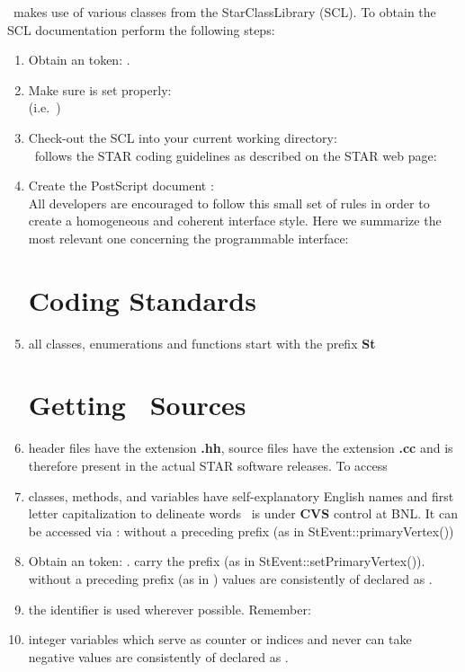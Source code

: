 \StEvent\ makes use of various classes from the StarClassLibrary (SCL).
To obtain the SCL documentation perform the following steps:
\begin{enumerate}
  \item Obtain an  token: .
  \item Make sure  is set properly:\\
    (i.e.~)
  \item Check-out the SCL into your current working directory:\\
\StEvent\ follows the STAR coding guidelines as described on the STAR web page: \\ 
  \item Create the PostScript document :\\
All developers are encouraged to follow this small set of rules 
in order to create a homogeneous and coherent interface style.
Here we summarize the most relevant one concerning the programmable interface:
\section{Coding Standards}  
\item all classes, enumerations and functions start with the prefix \textbf{St}
\section{Getting \StEvent\ Sources}  
\item header files have the extension \textbf{.hh},
    source files have the extension\textbf{ .cc}
and is therefore present in the actual STAR software releases. To access
\item classes, methods, and variables have self-explanatory English names
    and first letter capitalization to delineate words
\StEvent\ is under {\bf CVS} control at BNL.  It can
be accessed via :   
    without a preceding  prefix (as in StEvent::primaryVertex())
  \item Obtain an  token: .
    carry the prefix  (as in  StEvent::setPrimaryVertex()).
    without a preceding  prefix (as in )
    values are consistently of declared as . 
\item the  identifier is used wherever possible. Remember:
\item integer variables which serve as counter or indices and never can take negative
    values are consistently of declared as . 

\end{enumerate}
